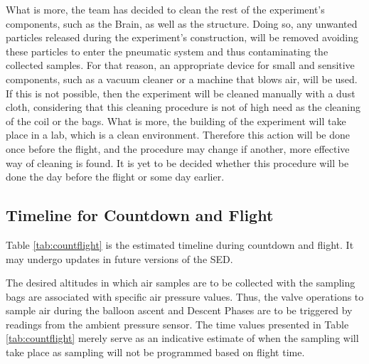 \documentclass[a4paper,12pt,twoside]{article}
\begin{document}
What is more, the team has decided to clean the rest of the experiment's components, such as the Brain, as well as the structure. Doing so, any unwanted particles released during the experiment's construction, will be removed avoiding these particles to enter the pneumatic system and thus contaminating the collected samples. 
For that reason, an appropriate device for small and sensitive components, such as a vacuum cleaner or a machine that blows air, will be used. If this is not possible, then the experiment will be cleaned manually with a dust cloth, considering that this cleaning procedure is not of high need as the cleaning of the coil or the bags. What is more, the building of the experiment will take place in a lab, which is a clean environment. Therefore this action will be done once before the flight, and the procedure may change if another, more effective way of cleaning is found.
It is yet to be decided whether this procedure will be done the day before the flight or some day earlier.

\pagebreak
\subsection{Timeline for Countdown and Flight}
Table \ref{tab:countflight} is the estimated timeline during countdown and flight. It may undergo updates in future versions of the SED.

The desired altitudes in which air samples are to be collected with the sampling bags are associated with specific air pressure values. Thus, the valve operations to sample air during the balloon ascent and Descent Phases are to be triggered by readings from the ambient pressure sensor. The time values presented in Table \ref{tab:countflight} merely serve as an indicative estimate of when the sampling will take place as sampling will not be programmed based on flight time.
\end{document}
